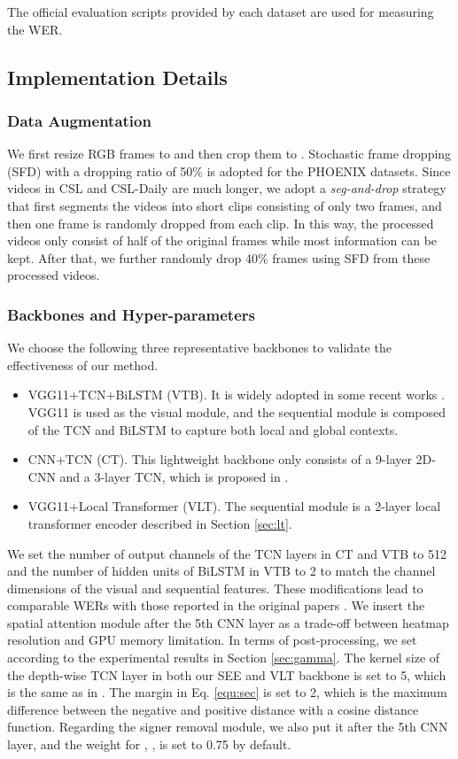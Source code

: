 \documentclass[acmsmall,screen]{acmart}
\begin{document}
The official evaluation scripts provided by each dataset are used for measuring the WER.


\subsection{Implementation Details}
\subsubsection{Data Augmentation}
We first resize RGB frames to  and then crop them to .
Stochastic frame dropping (SFD) \cite{sfl} with a dropping ratio of 50\% is adopted for the PHOENIX datasets.
Since videos in CSL and CSL-Daily are much longer, we adopt a \textit{seg-and-drop} strategy that first segments the videos into short clips consisting of only two frames, and then one frame is randomly dropped from each clip.
In this way, the processed videos only consist of half of the original frames while most information can be kept.
After that, we further randomly drop 40\% frames using SFD from these processed videos.

\subsubsection{Backbones and Hyper-parameters}
We choose the following three representative backbones to validate the effectiveness of our method.
\begin{itemize}
    \item VGG11+TCN+BiLSTM (VTB). It is widely adopted in some recent works \cite{stmc, vac}. VGG11 \cite{vggnet} is used as the visual module, and the sequential module is composed of the TCN and BiLSTM to capture both local and global contexts.
    
    \item CNN+TCN (CT). This lightweight backbone only consists of a 9-layer 2D-CNN and a 3-layer TCN, which is proposed in \cite{fcn}.
    
    \item VGG11+Local Transformer (VLT). The sequential module is a 2-layer local transformer encoder described in Section \ref{sec:lt}. 
\end{itemize}
We set the number of output channels of the TCN layers in CT and VTB to 512 and the number of hidden units of BiLSTM in VTB to 2 to match the channel dimensions of the visual and sequential features. 
These modifications lead to comparable WERs with those reported in the original papers \cite{fcn, stmc}.
We insert the spatial attention module after the 5th CNN layer as a trade-off between heatmap resolution and GPU memory limitation.
In terms of post-processing, we set  according to the experimental results in Section \ref{sec:gamma}.
The kernel size of the depth-wise TCN layer in both our SEE and VLT backbone is set to 5, which is the same as in \cite{qanet}.
The margin  in Eq. \ref{equ:sec} is set to 2, which is the maximum difference between the negative and positive distance with a cosine distance function.
Regarding the signer removal module, we also put it after the 5th CNN layer, and the weight for , , is set to 0.75 by default.
\end{document}
